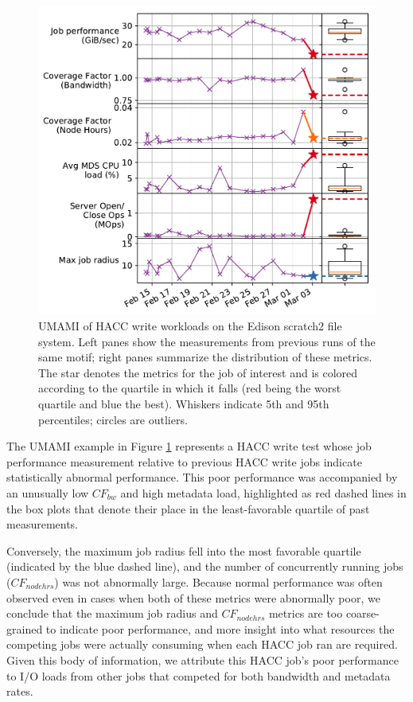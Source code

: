 {\begin{figure}[t]
    \centering
    \includegraphics[width=1.0\columnwidth]{figs/umami-scratch2-hacc-write.pdf}
    \vspace{-.25in}
    \caption{UMAMI of HACC write workloads on the Edison scratch2 file system.
    Left panes show the measurements from previous runs of the same motif; right panes summarize the distribution of these metrics.
    The star denotes the metrics for the job of interest and is colored according to the quartile in which it falls (red being the worst quartile and blue the best).
    Whiskers indicate 5th and 95th percentiles; circles are outliers.}
    \label{fig:umami-scratch2-hacc-write}
    \vspace{-.2in}
\end{figure}

The UMAMI example in Figure \ref{fig:umami-scratch2-hacc-write} represents a HACC write test whose job performance measurement relative to previous HACC write jobs indicate statistically abnormal performance.
This poor performance was accompanied by an unusually low $\mathit{CF}_{\mathit{bw}}$ and high metadata load, highlighted as red dashed lines in the box plots that denote their place in the least-favorable quartile of past measurements.

Conversely, the maximum job radius fell into the most favorable quartile (indicated by the blue dashed line),
and the number of concurrently running jobs ($\mathit{CF}_{\mathit{nodehrs}}$) was not abnormally large.
Because normal performance was often observed even in cases when both of these metrics were abnormally poor, we conclude that the maximum job radius and $\mathit{CF}_{\mathit{nodehrs}}$ metrics are too coarse-grained to indicate poor performance, and
more insight into what resources the competing jobs were actually consuming when each HACC job ran are required.
Given this body of information, we attribute this HACC job's poor performance to I/O loads from other jobs that competed for both bandwidth and metadata rates.

}
